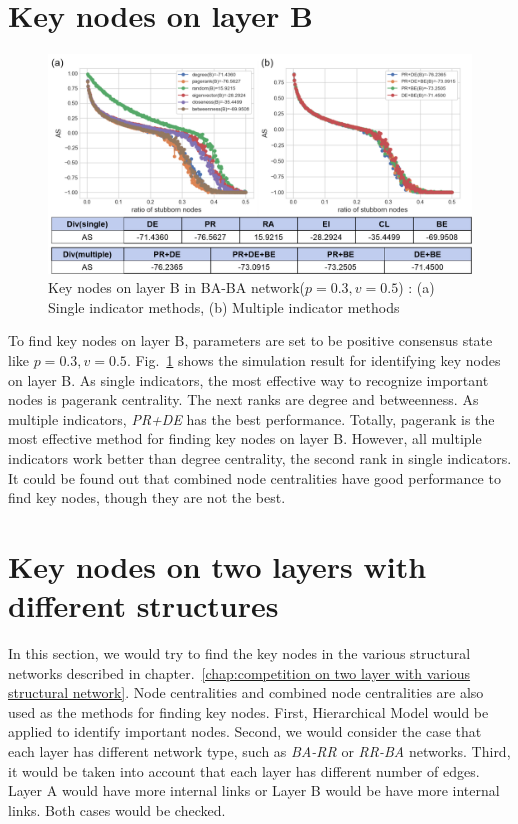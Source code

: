 \section{Key nodes on layer B}
\begin{figure}[!htb]
	\centering
	\includegraphics[width=\hsize]{figure/chap5_keynode_B.png}
	\caption{Key nodes on layer B in BA-BA network($p=0.3, v=0.5$) : (a) Single indicator methods, (b) Multiple indicator methods}
	\label{chap5_keynode_B}
\end{figure}

To find key nodes on layer B, parameters are set to be positive consensus state like $p=0.3, v=0.5$. Fig.~\ref{chap5_keynode_B} shows the simulation result for identifying key nodes on layer B. As single indicators, the most effective way to recognize important nodes is pagerank centrality. The next ranks are degree and betweenness. As multiple indicators, \textit{PR+DE} has the best performance. Totally, pagerank is the most effective method for finding key nodes on layer B. However, all multiple indicators work better than degree centrality, the second rank in single indicators. It could be found out that combined node centralities have good performance to find key nodes, though they are not the best. 

\section{Key nodes on two layers with different structures}
In this section, we would try to find the key nodes in the various structural networks described in chapter.~\ref{chap:competition on two layer with various structural network}. Node centralities and combined node centralities are also used as the methods for finding key nodes. First, Hierarchical Model would be applied to identify important nodes. Second, we would consider the case that each layer has different network type, such as \textit{BA-RR} or \textit{RR-BA} networks. Third, it would be taken into account that each layer has different number of edges. Layer A would have more internal links or Layer B would be have more internal links. Both cases would be checked. 

